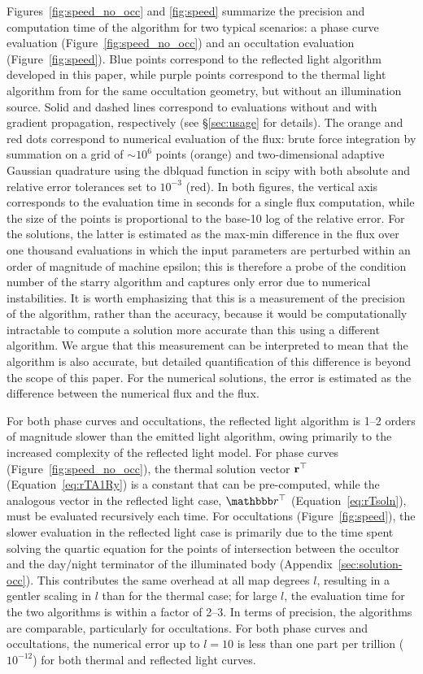 \documentclass[modern]{aastex62}
\begin{document}
Figures~\ref{fig:speed_no_occ} and \ref{fig:speed} summarize
the precision and computation time of the \starry algorithm for
two typical scenarios: a phase curve evaluation
(Figure~\ref{fig:speed_no_occ}) and an occultation evaluation
(Figure~\ref{fig:speed}).
Blue points correspond to the reflected light algorithm developed
in this paper, while purple points correspond to the thermal light
algorithm from \citet{Luger2019} for the same occultation geometry,
but without an illumination source.
Solid and dashed lines correspond to evaluations without and
with gradient propagation, respectively (see \S\ref{sec:usage}
for details).
The orange and red dots
correspond to numerical evaluation of the flux:
brute force integration by summation on a grid of ${\sim}10^6$ points
(orange) and two-dimensional adaptive Gaussian quadrature using the
\textsf{dblquad} function in \textsf{scipy} \citep{scipy} with
both absolute and relative error tolerances set to $10^{-3}$ (red).
%
In both figures, the vertical axis corresponds to the evaluation
time in seconds for a single flux computation, while the size of the
points is proportional to the base-10 log of the relative error. For the
\starry solutions, the latter is estimated as the max-min difference
in the flux over one thousand evaluations in which the input parameters
are perturbed within an order of magnitude of machine epsilon; this is
therefore a probe of the condition number of the starry algorithm and
captures only error due to numerical instabilities.
It is worth emphasizing that this is a measurement of the precision of
the algorithm, rather than the accuracy, because it would be computationally
intractable to compute a solution more accurate than this using a different
algorithm.
We argue that this measurement can be interpreted to mean that the algorithm
is also accurate, but detailed quantification of this difference is beyond the
scope of this paper.
For the numerical
solutions, the error is estimated as the difference between the numerical
flux and the \starry flux.

For both phase curves and occultations, the \starry reflected
light algorithm is 1--2 orders of
magnitude slower than the emitted light algorithm, owing
primarily to the increased complexity of the reflected light model.
For phase curves (Figure~\ref{fig:speed_no_occ}),
the thermal solution vector $\mathbf{r}^\top$ (Equation~\ref{eq:rTA1Ry}) is a constant
that can be pre-computed, while the analogous vector in the reflected
light case, $\rT$ (Equation~\ref{eq:rTsoln}), must be evaluated
recursively each time. For occultations (Figure~\ref{fig:speed}),
the slower evaluation in the reflected light case is primarily due to
the time spent solving the quartic equation for the points of intersection
between the occultor and the day/night terminator of the illuminated
body (Appendix~\ref{sec:solution-occ}). This contributes the
same overhead at all map degrees $l$, resulting in a gentler scaling
in $l$ than for the thermal case; for large $l$, the evaluation time
for the two algorithms is within a factor of 2--3.
%
In terms of precision, the algorithms are comparable, particularly
for occultations. For both phase curves and occultations, the numerical error up
to $l=10$ is less than one part per trillion ($10^{-12}$) for both thermal
and reflected light curves.
\end{document}
